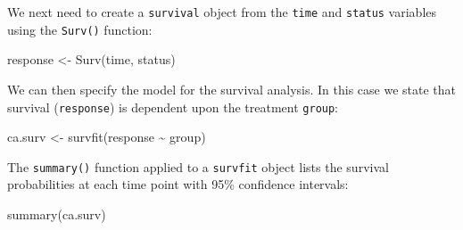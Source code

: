 \documentclass[
  12pt,
]{book}
\newenvironment{Shaded}{\begin{snugshade}}{\end{snugshade}}
\newcommand{\FunctionTok}[1]{\textcolor[rgb]{0.00,0.00,0.00}{#1}}
\newcommand{\NormalTok}[1]{#1}
\newcommand{\OtherTok}[1]{\textcolor[rgb]{0.56,0.35,0.01}{#1}}
\newcommand{\SpecialCharTok}[1]{\textcolor[rgb]{0.00,0.00,0.00}{#1}}
\begin{document}
We next need to create a \texttt{survival} object from the \texttt{time} and \texttt{status} variables using the \texttt{Surv()} function:

\begin{Shaded}
\begin{Highlighting}[]
\NormalTok{response }\OtherTok{\textless{}{-}} \FunctionTok{Surv}\NormalTok{(time, status)}
\end{Highlighting}
\end{Shaded}

We can then specify the model for the survival analysis. In this case we state that survival (\texttt{response}) is dependent upon the treatment \texttt{group}:

\begin{Shaded}
\begin{Highlighting}[]
\NormalTok{ca.surv }\OtherTok{\textless{}{-}} \FunctionTok{survfit}\NormalTok{(response }\SpecialCharTok{\textasciitilde{}}\NormalTok{ group)}
\end{Highlighting}
\end{Shaded}

The \texttt{summary()} function applied to a \texttt{survfit} object lists the survival probabilities at each time point with 95\% confidence intervals:

\begin{Shaded}
\begin{Highlighting}[]
\FunctionTok{summary}\NormalTok{(ca.surv)}
\end{Highlighting}
\end{Shaded}
\end{document}
